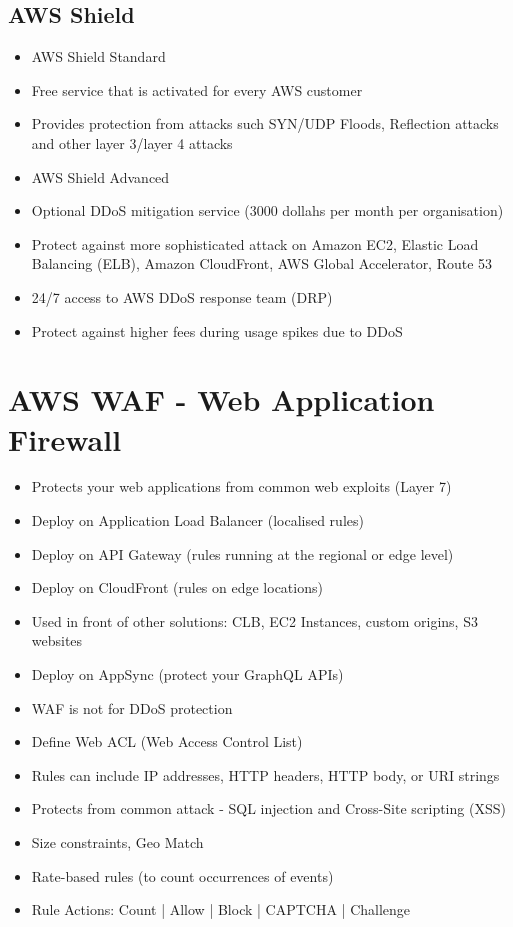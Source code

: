 \subsection{AWS Shield}
\begin{itemize}
    \item AWS Shield Standard
    \item Free service that is activated for every AWS customer
    \item Provides protection from attacks such SYN/UDP Floods, Reflection attacks and other layer 3/layer 4 attacks
    \item AWS Shield Advanced
    \item Optional DDoS mitigation service (3000 dollahs per month per organisation)
    \item Protect against more sophisticated attack on Amazon EC2, Elastic Load Balancing (ELB), Amazon CloudFront, AWS Global Accelerator, Route 53
    \item 24/7 access to AWS DDoS response team (DRP)
    \item Protect against higher fees during usage spikes due to DDoS
\end{itemize}


\section{AWS WAF - Web Application Firewall}
\begin{itemize}
    \item Protects your web applications from common web exploits (Layer 7)
    \item Deploy on Application Load Balancer (localised rules)
    \item Deploy on API Gateway (rules running at the regional or edge level)
    \item Deploy on CloudFront (rules on edge locations)
    \item Used in front of other solutions: CLB, EC2 Instances, custom origins, S3 websites
    \item Deploy on AppSync (protect your GraphQL APIs)
    \item WAF is not for DDoS protection
    \item Define Web ACL (Web Access Control List)
    \item Rules can include IP addresses, HTTP headers, HTTP body, or URI strings
    \item Protects from common attack - SQL injection and Cross-Site scripting (XSS)
    \item Size constraints, Geo Match
    \item Rate-based rules (to count occurrences of events)
    \item Rule Actions: Count | Allow | Block | CAPTCHA | Challenge
\end{itemize}

